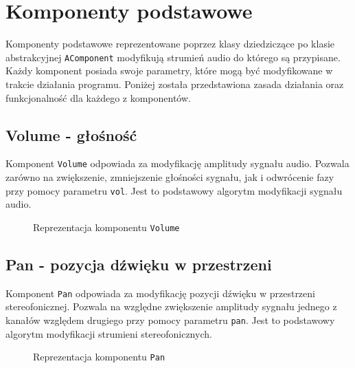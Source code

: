 \section{Komponenty podstawowe}
Komponenty podstawowe reprezentowane poprzez klasy dziedziczące po klasie abstrakcyjnej \texttt{AComponent} modyfikują strumień audio do którego są przypisane. Każdy komponent posiada swoje parametry, które mogą być modyfikowane w trakcie działania programu. Poniżej została przedstawiona zasada działania oraz funkcjonalność dla każdego z komponentów. 

\subsection{Volume - głośność}
Komponent \texttt{Volume} odpowiada za modyfikację amplitudy sygnału audio. Pozwala zarówno na zwiększenie, zmniejszenie głośności sygnału, jak i odwrócenie fazy przy pomocy parametru \texttt{vol}. Jest to podstawowy algorytm modyfikacji sygnału audio.

\begin{figure}[H]
    \centering
    
    \caption{Reprezentacja komponentu \texttt{Volume}}
    \label{fig:Reprezentacja komponentu Volume}
\end{figure}

\subsection{Pan - pozycja dźwięku w przestrzeni}
Komponent \texttt{Pan} odpowiada za modyfikację pozycji dźwięku w przestrzeni stereofonicznej. Pozwala na względne zwiększenie amplitudy sygnału jednego z kanałów względem drugiego przy pomocy parametru \texttt{pan}. Jest to podstawowy algorytm modyfikacji strumieni stereofonicznych.

\begin{figure}[H]
    \centering
    
    \caption{Reprezentacja komponentu \texttt{Pan}}
    \label{fig:Reprezentacja komponentu Pan}
\end{figure}

